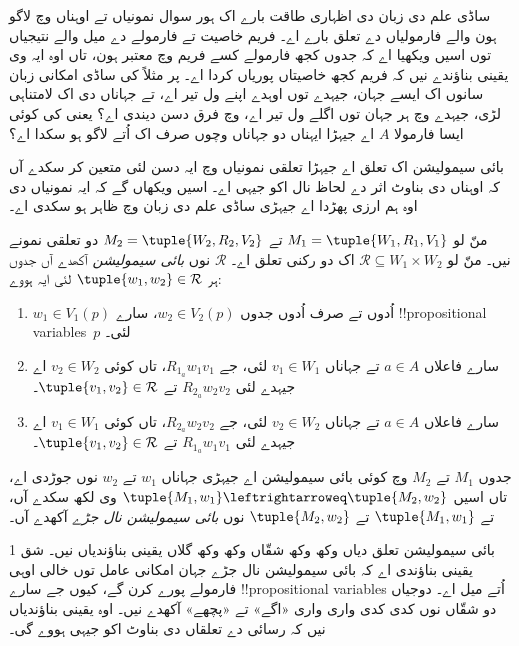 \documentclass[../../../include/open-logic-section]{subfiles}
\begin{document}


ساڈی علم دی زبان دی اظہاری طاقت بارے اک ہور سوال نمونیاں تے
اوہناں وچ لاگو ہون والے فارمولیاں دے تعلق بارے اے۔ فریم خاصیت تے
فارمولے دے میل والے نتیجیاں توں اسیں ویکھیا اے کہ جدوں کجھ فارمولے
کسے فریم وچ معتبر ہون، تاں اوہ ایہ وی یقینی بناؤندے نیں کہ فریم
کجھ خاصیتاں پوریاں کردا اے۔ پر مثلاً کی ساڈی امکانی زبان سانوں
اک ایسے جہان، جیہدے توں اوہدے اپنے ول تیر اے، تے جہاناں دی اک
لامتناہی لڑی، جیہدے وچ ہر جہان توں اگلے ول تیر اے، وچ فرق دسن
دیندی اے؟ یعنی کی کوئی ایسا فارمولا $A$ اے جیہڑا ایہناں دو جہاناں
وچوں صرف اک اُتے لاگو ہو سکدا اے؟

بائی سیمولیشن اک تعلق اے جیہڑا تعلقی نمونیاں وچ ایہ دسن لئی
متعین کر سکدے آں کہ اوہناں دی بناوٹ اثر دے لحاظ نال اکو جیہی اے۔
اسیں ویکھاں گے کہ ایہ نمونیاں دی اوہ ہم ارزی پھڑدا اے جیہڑی ساڈی
علم دی زبان وچ ظاہر ہو سکدی اے۔

\begin{defn}
منّ لو $M_1 = \tuple{W_1, R_1, V_1}$ تے $M_2 = \tuple{W_2, R_2, V_2}$
دو تعلقی نمونے نیں۔ منّ لو $\mathcal{R} \subseteq W_1 \times W_2$
اک دو رکنی تعلق اے۔ $\mathcal{R}$ نوں \emph{بائی سیمولیشن} آکھدے
آں جدوں ہر $\tuple{w_1, w_2} \in \mathcal{R}$ لئی ایہ ہووے:

\begin{enumerate}
  \item $w_1 \in V_1(p)$ اُدوں تے صرف اُدوں جدوں $w_2 \in V_2(p)$،
    سارے !!{propositional variable}s~$p$ لئی۔
  \item سارے فاعلاں $a \in A$ تے جہاناں $v_1 \in W_1$ لئی، جے
    $R_{1_a} w_1 v_1$، تاں کوئی $v_2 \in W_2$ اے جیہدے لئی
    $R_{2_a} w_2 v_2$ تے $\tuple{v_1, v_2} \in \mathcal{R}$۔
  \item سارے فاعلاں $a \in A$ تے جہاناں $v_2 \in W_2$ لئی، جے
    $R_{2_a} w_2 v_2$، تاں کوئی $v_1 \in W_1$ اے جیہدے لئی
    $R_{1_a} w_1 v_1$ تے $\tuple{v_1, v_2} \in \mathcal{R}$۔
\end{enumerate}

جدوں $M_1$ تے $M_2$ وچ کوئی بائی سیمولیشن اے جیہڑی جہاناں
$w_1$ تے $w_2$ نوں جوڑدی اے، تاں اسیں
$\tuple{M_1, w_1} \leftrightarroweq \tuple{M_2, w_2}$ وی لکھ سکدے
آں، تے $\tuple{M_1, w_1}$ تے $\tuple{M_2, w_2}$ نوں
\emph{بائی سیمولیشن نال جڑے} آکھدے آں۔
\end{defn}

بائی سیمولیشن تعلق دیاں وکھ وکھ شقّاں وکھ وکھ گلاں یقینی بناؤندیاں
نیں۔ شق 1 یقینی بناؤندی اے کہ بائی سیمولیشن نال جڑے جہان امکانی
عامل توں خالی اوہی فارمولے پورے کرن گے، کیوں جے سارے
!!{propositional variable}s اُتے میل اے۔ دوجیاں دو شقّاں نوں کدی
کدی واری واری «اگے» تے «پچھے» آکھدے نیں۔ اوہ یقینی بناؤندیاں نیں
کہ رسائی دے تعلقاں دی بناوٹ اکو جیہی ہووے گی۔
\end{document}
